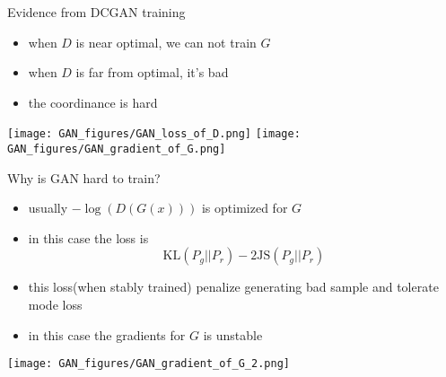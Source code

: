 \documentclass[9pt]{beamer}
\begin{document}
\begin{frame}{Evidence from DCGAN training}
  \begin{itemize}
  \item when $D$ is near optimal, we can not train $G$
  \item when $D$ is far from optimal, it's bad
  \item the coordinance is hard
  \end{itemize}
  \texttt{[image: GAN\_figures/GAN\_loss\_of\_D.png]}
  \texttt{[image: GAN\_figures/GAN\_gradient\_of\_G.png]}
\end{frame}

\begin{frame}{Why is GAN hard to train?}
  \begin{itemize}
  \item usually $-\log(D(G(x)))$ is optimized for $G$
  \item in this case the loss is $$\text{KL}(P_g||P_r)-2 \text{JS}(P_g||P_r)$$
  \item this loss(when stably trained) penalize generating bad sample and tolerate mode loss
  \item in this case the gradients for $G$ is unstable
  \end{itemize}
  \texttt{[image: GAN\_figures/GAN\_gradient\_of\_G\_2.png]}
\end{frame}
\end{document}
